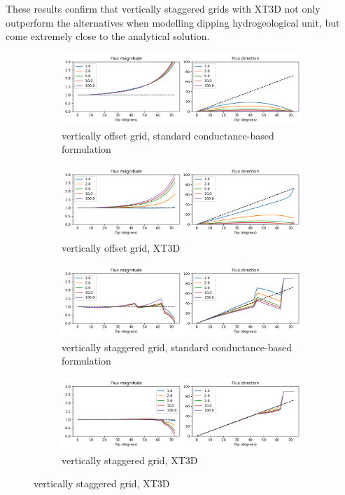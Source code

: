 \documentclass{article}
\begin{document}
These results confirm that vertically staggered grids with XT3D not only outperform the alternatives when modelling dipping hydrogeological unit, but come extremely close to the analytical solution.

\begin{figure}[p!]
\centering
\begin{subfigure}{0.9\textwidth}
	\includegraphics[width=\textwidth]{../figures/fig4_0_paper.png}
	\caption{vertically offset grid, standard conductance-based formulation}
	\label{fig:fig4a}
\end{subfigure}
\begin{subfigure}{0.9\textwidth}
	\includegraphics[width=\textwidth]{../figures/fig4_1_paper.png}
	\caption{vertically offset grid, XT3D}
	\label{fig:fig4b}
\end{subfigure}
\begin{subfigure}{0.9\textwidth}
	\includegraphics[width=\textwidth]{../figures/fig4_2_paper.png}
	\caption{vertically staggered grid, standard conductance-based formulation}
	\label{fig:fig4c}
\end{subfigure}
\begin{subfigure}{0.9\textwidth}
	\includegraphics[width=\textwidth]{../figures/fig4_3_paper.png}
	\caption{vertically staggered grid, XT3D}
	\label{fig:fig4d}
\end{subfigure}


\end{figure}
\end{document}
